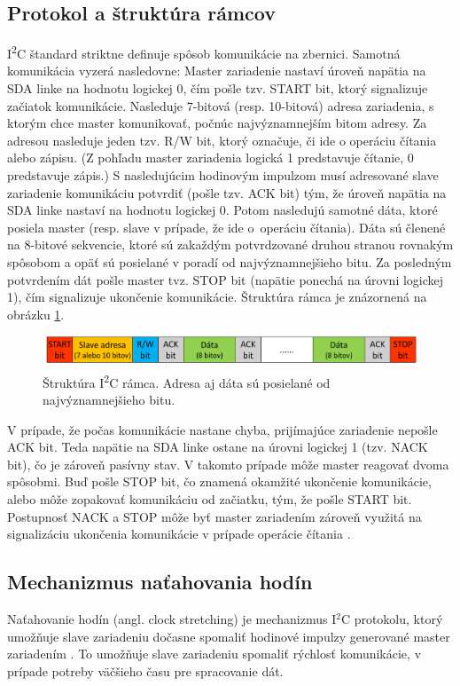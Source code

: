 \subsection{Protokol a štruktúra rámcov}
I\textsuperscript{2}C štandard striktne definuje spôsob komunikácie na zbernici. Samotná komunikácia vyzerá nasledovne: Master zariadenie nastaví úroveň napätia na SDA linke na hodnotu logickej 0, čím pošle tzv. START bit, ktorý signalizuje začiatok komunikácie. Nasleduje 7-bitová (resp. 10-bitová) adresa zariadenia, s ktorým chce master komunikovať, počnúc najvýznamnejším bitom adresy. Za adresou nasleduje jeden tzv. R/W bit, ktorý označuje, či ide o operáciu čítania alebo zápisu. (Z pohľadu master zariadenia logická 1 predstavuje čítanie, 0 predstavuje zápis.) S nasledujúcim hodinovým impulzom musí adresované slave zariadenie komunikáciu potvrdiť (pošle tzv. ACK bit) tým, že úroveň napätia na SDA linke nastaví na hodnotu logickej 0. Potom nasledujú samotné dáta, ktoré posiela master (resp. slave v prípade, že ide o~operáciu čítania). Dáta sú členené na 8-bitové sekvencie, ktoré sú zakaždým potvrdzované druhou stranou rovnakým spôsobom a opäť sú posielané v poradí od najvýznamnejšieho bitu. Za posledným potvrdením dát pošle master tvz. STOP bit (napätie ponechá na úrovni logickej 1), čím signalizuje ukončenie komunikácie. Štruktúra rámca je znázornená na obrázku \ref{obr:i2cFrame}.

\begin{figure}
    \centerline{\includegraphics[width=1\textwidth]{images/busses/i2cFrame.png}}
    \caption[Štruktúra I\textsuperscript{2}C rámca]{Štruktúra I\textsuperscript{2}C rámca. Adresa aj dáta sú posielané od najvýznamnejšieho bitu.}
    \label{obr:i2cFrame}
\end{figure}

V prípade, že počas komunikácie nastane chyba, prijímajúce zariadenie nepošle ACK bit. Teda napätie na SDA linke ostane na úrovni logickej 1 (tzv. NACK bit), čo je zároveň pasívny stav. V takomto prípade môže master reagovať dvoma spôsobmi. Buď pošle STOP bit, čo znamená okamžité ukončenie komunikácie, alebo môže zopakovať komunikáciu od začiatku, tým, že pošle START bit. Postupnosť NACK a STOP môže byť master zariadením zároveň využitá na signalizáciu ukončenia komunikácie v prípade operácie čítania \cite{i2cSpec}.

\subsection{Mechanizmus naťahovania hodín}
Naťahovanie hodín (angl. clock stretching) je mechanizmus I$^2$C protokolu, ktorý umožňuje slave zariadeniu dočasne spomaliť hodinové impulzy generované master zariadením \cite{i2cSpec}. To umožňuje slave zariadeniu spomaliť rýchlosť komunikácie, v prípade potreby väčšieho času pre spracovanie dát.

